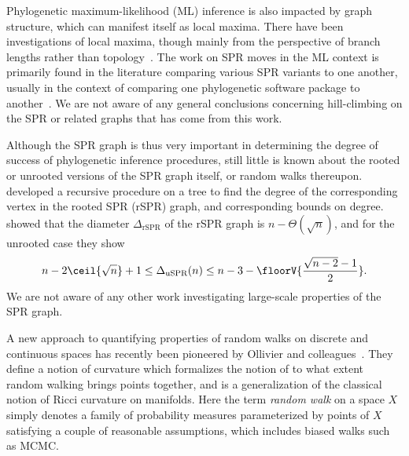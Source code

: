 \documentclass[11pt,onecolumn,conference]{IEEEtran}
\begin{document}
Phylogenetic maximum-likelihood (ML) inference is also impacted by graph structure, which can manifest itself as local maxima.
There have been investigations of local maxima, though mainly from the perspective of branch lengths rather than topology~\cite{Fukami1989-fs,Steel1994-pt,Chor2003-wh,Chor2000-ea}.
The work on SPR moves in the ML context is primarily found in the literature comparing various SPR variants to one another, usually in the context of comparing one phylogenetic software package to another~\cite{Hordijk2005-dl,Stamatakis2006-yz,Price2010-fi,Guindon2010-lo}.
We are not aware of any general conclusions concerning hill-climbing on the SPR or related graphs that has come from this work.

Although the SPR graph is thus very important in determining the degree of success of phylogenetic inference procedures, still little is known about the rooted or unrooted versions of the SPR graph itself, or random walks thereupon.
\cite{Song2003-gf} developed a recursive procedure on a tree to find the degree of the corresponding vertex in the rooted SPR (rSPR) graph, and corresponding bounds on degree.
\cite{Ding2011-bj} showed that the diameter $\Delta_{\text{rSPR}}$ of the rSPR graph is $n - \Theta(\sqrt n)$, and for the unrooted case they show
$$ n - 2\ceil{\sqrt{n}} + 1
\le \Delta_{\text{uSPR}}(n)
\le n - 3 - \floorV{\frac{\sqrt{n - 2} - 1}{2}}.
$$
We are not aware of any other work investigating large-scale properties of the SPR graph.

A new approach to quantifying properties of random walks on discrete and continuous spaces has recently been pioneered by Ollivier and colleagues~\cite{Ollivier2009-bw,Joulin2010-jg}.
They define a notion of curvature which formalizes the notion of to what extent random walking brings points together, and is a generalization of the classical notion of Ricci curvature on manifolds.
Here the term \emph{random walk} on a space $X$ simply denotes a family of probability measures parameterized by points of $X$ satisfying a couple of reasonable assumptions, which includes biased walks such as MCMC.
\end{document}
